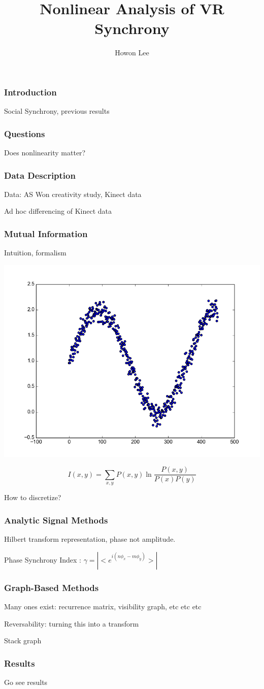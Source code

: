 \documentclass{beamer}
\begin{document}
\title{Nonlinear Analysis of VR Synchrony}
\author{Howon Lee}
\maketitle

\begin{frame}
  \frametitle{Introduction}
  Social Synchrony, previous results
\end{frame}
\begin{frame}
  \frametitle{Questions}
  Does nonlinearity matter?
\end{frame}
\begin{frame}
  \frametitle{Data Description}
  Data: AS Won creativity study, Kinect data

  Ad hoc differencing of Kinect data
\end{frame}
\begin{frame}
  \frametitle{Mutual Information}
  Intuition, formalism

  \includegraphics[scale=0.2]{mi_ex}
  
  $$I(x,y) = \sum_{x,y}P(x,y) \ln \frac{P(x,y)}{P(x)P(y)}$$

  How to discretize?
\end{frame}
\begin{frame}
  \frametitle{Analytic Signal Methods}
  Hilbert transform representation, phase not amplitude.

  Phase Synchrony Index : $\gamma = |<e^{i(n\phi_x - m\phi_y)}>|$
\end{frame}
\begin{frame}
  \frametitle{Graph-Based Methods}
  Many ones exist: recurrence matrix, visibility graph, etc etc etc

  Reversability: turning this into a transform

  Stack graph
\end{frame}
\begin{frame}
  \frametitle{Results}
  Go see results
\end{frame}
\end{document}
